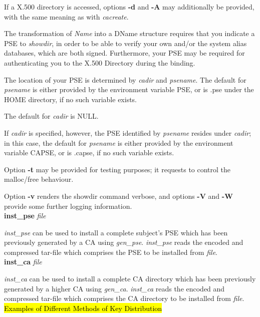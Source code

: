 If a X.500 directory is accessed, options {\bf -d} and {\bf -A} may additionally be
provided, with the same meaning as with {\em cacreate}.

The transformation of {\em Name} into a DName structure requires that you indicate a PSE
to {\em showdir}, in order to be able to verify your own and/or the system alias databases,
which are both signed. Furthermore, your PSE may be required for authenticating you
to the X.500 Directory during the binding.

The location of your PSE is determined by {\em cadir} and {\em psename}. The default for {\em 
psename} is either provided by the environment variable PSE, or is .pse under the HOME directory, if no such
variable exists.
 
The default for {\em cadir} is NULL. 

If {\em cadir} is specified,
however, the PSE identified by {\em psename} resides under {\em cadir}; in this case, the default
for {\em psename} is either provided by the environment variable CAPSE, or is .capse, if no such variable
exists.

Option {\bf -t} may be provided for testing purposes; it requests to control the malloc/free behaviour.

Option {\bf -v} renders the showdir command verbose, and options {\bf -V} and {\bf -W} 
provide some further logging
information.
\\ [1em]
{\bf inst\_pse} {\em file}

{\em inst\_pse} can be used to install a complete subject's PSE which has been previously
generated by a CA using {\em gen\_pse}. {\em inst\_pse} reads the encoded and compressed 
tar-file which comprises the PSE to be installed from {\em file}.
\\ [1em]
{\bf inst\_ca} {\em file}

{\em inst\_ca} can be used to install a complete CA directory which has been previously
generated by a higher CA using {\em gen\_ca}. {\em inst\_ca} reads the encoded and compressed 
tar-file which comprises the CA directory to be installed from {\em file}.
\newpage
\hl{Examples of Different Methods of Key Distribution}


